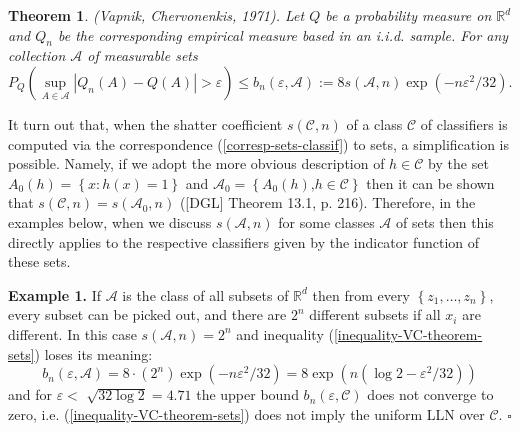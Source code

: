\documentclass[11pt,twoside]{article}%
\theoremstyle{change}
\newtheorem{theorem}{Theorem}[section]
\begin{document}
\begin{theorem}
(Vapnik, Chervonenkis, 1971). Let $Q$ be a probability measure on
$\mathbb{R}^{d}$ and $Q_{n}$ be the corresponding empirical measure based in
an i.i.d. sample. For any collection $\mathcal{A}$ of measurable sets%
\begin{equation}
P_{Q}\left(  \sup_{A\in\mathcal{A}}\left\vert Q_{n}(A)-Q\left(  A\right)
\right\vert >\varepsilon\right)  \leq b_{n}(\varepsilon,\mathcal{A}%
):=8s\left(  \mathcal{A},n\right)  \exp\left(  -n\varepsilon^{2}/32\right)
.\label{inequality-VC-theorem-sets}%
\end{equation}

\end{theorem}

It turn out that, when the shatter coefficient $s\left(  \mathcal{C},n\right)
$ of a class $\mathcal{C}$ of classifiers is computed via the correspondence
(\ref{corresp-sets-classif}) to sets, a simplification is possible. Namely, if
we adopt the more obvious description of $h\in\mathcal{C}$ by the set
$A_{0}(h)=\left\{  x:h(x)=1\right\}  $ and $\mathcal{A}_{0}=\left\{
A_{0}(h)\text{,}h\in\mathcal{C}\right\}  $ then it can be shown that $s\left(
\mathcal{C},n\right)  =s\left(  \mathcal{A}_{0},n\right)  $ ([DGL] Theorem
13.1, p. 216). Therefore, in the examples below, when we discuss $s\left(
\mathcal{A},n\right)  $ for some classes $\mathcal{A}$ of sets then this
directly applies to the respective classifiers given by the indicator function
of these sets.

\bigskip

\textbf{Example 1.} If $\mathcal{A}$ is the class of all subsets of
$\mathbb{R}^{d}$ then from every $\left\{  z_{1},\ldots,z_{n}\right\}  $,
every subset can be picked out, and there are $2^{n}$ different subsets if all
$x_{i}$ are different. In this case $s\left(  \mathcal{A},n\right)  =2^{n}$
and inequality (\ref{inequality-VC-theorem-sets}) loses its meaning:
\[
b_{n}(\varepsilon,\mathcal{A})=8\cdot\left(  2^{n}\right)  \exp\left(
-n\varepsilon^{2}/32\right)  =8\exp\left(  n\left(  \log2-\varepsilon
^{2}/32\right)  \right)
\]
and for $\varepsilon<$ $\sqrt{32\log2}=4.71$ the upper bound $b_{n}%
(\varepsilon,\mathcal{C})$ does not converge to zero, i.e.
(\ref{inequality-VC-theorem-sets}) does not imply the uniform LLN over
$\mathcal{C}$. $\square$\bigskip\bigskip
\end{document}
